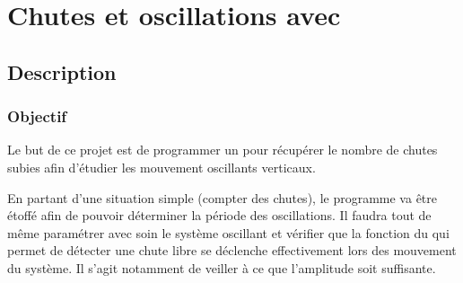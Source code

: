 

\section{Chutes et oscillations avec \mb}


\subsection{Description}

\subsubsection{Objectif}

\begin{formule}
Le but de ce projet est de programmer un \mb pour récupérer le nombre de chutes subies afin d'étudier les mouvement oscillants verticaux.

En partant d'une situation simple (compter des chutes), le programme va être étoffé afin de pouvoir déterminer la période des oscillations. Il faudra tout de même paramétrer avec soin le système oscillant et vérifier que la fonction du \mb qui permet de détecter une chute libre se déclenche effectivement lors des mouvement du système. Il s'agit notamment de veiller à ce que l'amplitude soit suffisante.
\end{formule}

